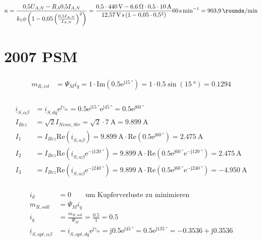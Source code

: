 \documentclass[11pt,a4paper]{scrartcl}
\newcommand{\mybr}[1]{\left(#1\right)}
\renewcommand{\j}{\mathrm{j}}
\renewcommand{\i}{\underline{i}}
\newcommand{\0}{_{\mybr{0}}}
\newcommand{\1}{_{\mybr{1}}}
\newcommand{\2}{_{\mybr{2}}}
\renewcommand{\e}{\mathrm{e}}
\renewcommand{\Re}{\mathrm{Re}}
\renewcommand{\Im}{\mathrm{Im}}
\newcommand{\isab}{\i_{S,\alpha\beta}}
\newcommand{\isdq}{\i_{S,dq}}
\begin{document}
\subsection{}
\begin{equation}
n=\frac{\num{0.5}U_{A,N}-R_A\num{0.5} I_{A,N}}{k_1\phi\mybr{1-\num{0.05}\mybr{\frac{\num{0.5}I_{A,N}}{I_{A,N}}}^2}}=\frac{\num{0.5}\cdot\SI{440}{\volt}-\SI{6.6}{\ohm}\cdot\num{0.5}\cdot\SI{10}{\ampere}}{\SI{12.57}{\volt\second}\mybr{1-\num{0.05}\cdot\num{0.5}^2}}\SI{60}{\second\per\minute}=\SI{903.9}{\rounds\per\minute}
\end{equation}

\clearpage
\part{2007 PSM}
\section{}
\begin{align}
	m_{R,ist}&=\Psi_M i_q=1\cdot\Im\mybr{\num{0.5}\e^{\j\SI{15}{\degree}}}=1\cdot\num{0.5}\sin\mybr{\SI{15}{\degree}}=\num{0.1294}
\end{align}
\section{}
\begin{align}
	\isab&=\isdq\e^{\j\gamma_m}=\num{0.5}\e^{\j\SI{15}{\degree}}\e^{\j\SI{45}{\degree}}=\num{0.5}\e^{\j\SI{60}{\degree}}\\
	I_{Bez}&=\sqrt{2}I_{Nenn,Str}=\sqrt{2}\cdot\SI{7}{\ampere}=\SI{9.899}{\ampere}\\
	I_1&=I_{Bez}\Re\mybr{\isab}=\SI{9.899}{\ampere}\cdot\Re\mybr{\num{0.5}\e^{\j\SI{60}{\degree}}}=\SI{2.475}{\ampere}\\
	I_2&=I_{Bez}\Re\mybr{\isab\e^{-\j\SI{120}{\degree}}}=\SI{9.899}{\ampere}\cdot\Re\mybr{\num{0.5}\e^{\j\SI{60}{\degree}}\e^{-\j\SI{120}{\degree}}}=\SI{2.475}{\ampere}\\
	I_3&=I_{Bez}\Re\mybr{\isab\e^{-\j\SI{240}{\degree}}}=\SI{9.899}{\ampere}\cdot\Re\mybr{\num{0.5}\e^{\j\SI{60}{\degree}}\e^{-\j\SI{240}{\degree}}}=\SI{-4.950}{\ampere}
\end{align}

\section{}
\begin{align}
	i_d&=0\quad\quad\text{um Kupferverluste zu minimieren}\\
	m_{R,soll}&=\Psi_M i_q\\
	i_q&=\frac{m_{R,soll}}{\Psi_M}=\frac{\num{0.5}}{1}=\num{0.5}\\
	\i_{S,opt,\alpha\beta}&=\i_{S,opt,dq}\e^{\j\gamma_m}=\j\num{0.5}\e^{\j\SI{45}{\degree}}=\num{0.5}\e^{\j\SI{135}{\degree}}=-\num{0.3536}+\j\num{0.3536}
\end{align}
\end{document}
